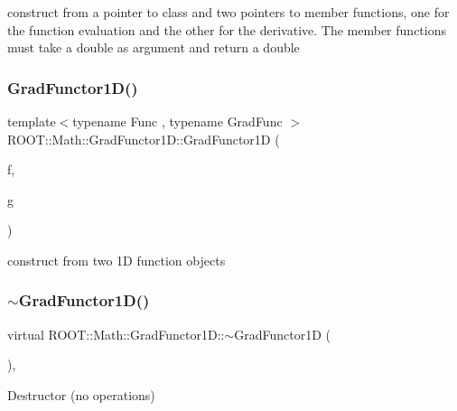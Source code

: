 construct from a pointer to class and two pointers to member functions, one for the function evaluation and the other for the derivative. The member functions must take a double as argument and return a double \mbox{\label{classROOT_1_1Math_1_1GradFunctor1D_a30baab2a961d896e4aab6e60ed30d260}} 
\subsubsection{\texorpdfstring{GradFunctor1D()}{GradFunctor1D()}\hspace{0.1cm}{\footnotesize\ttfamily [9/15]}}
{\footnotesize\ttfamily template$<$typename Func , typename Grad\+Func $>$ \\
R\+O\+O\+T\+::\+Math\+::\+Grad\+Functor1\+D\+::\+Grad\+Functor1D (\begin{DoxyParamCaption}\item[{const Func \&}]{f,  }\item[{const Grad\+Func \&}]{g }\end{DoxyParamCaption})\hspace{0.3cm}{\ttfamily [inline]}}

construct from two 1D function objects \mbox{\label{classROOT_1_1Math_1_1GradFunctor1D_ac711d3cc551b961aa16ecdcbf50308d6}} 
\subsubsection{\texorpdfstring{$\sim$GradFunctor1D()}{~GradFunctor1D()}\hspace{0.1cm}{\footnotesize\ttfamily [2/3]}}
{\footnotesize\ttfamily virtual R\+O\+O\+T\+::\+Math\+::\+Grad\+Functor1\+D\+::$\sim$\+Grad\+Functor1D (\begin{DoxyParamCaption}{ }\end{DoxyParamCaption})\hspace{0.3cm}{\ttfamily [inline]}, {\ttfamily [virtual]}}

Destructor (no operations) \mbox{\label{classROOT_1_1Math_1_1GradFunctor1D_af43388b384674d1e811cfbc1ad562816}} 

